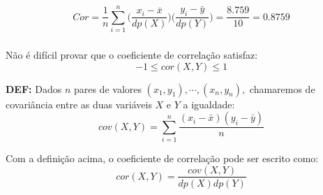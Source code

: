 \documentclass[14pt,aspectratio=1610]{beamer}
\begin{document}
\begin{frame}{}
\frametitle{}
\vspace{-0.5cm}
\begin{table}[htbp]
  \centering
  \caption{Cálculo do coeficiente de correlação.}
\end{table}%
$$Cor={\displaystyle \dfrac{1}{n}\sum_{i=1}^{n}\Biggl(\dfrac{x_{i}-\bar{x}}{dp(X)}\Biggl)\Biggl(\dfrac{y_{i}-\bar{y}}{dp(Y)}\Biggl)}=\dfrac{8.759}{10}=0.8759$$
\end{frame}

\begin{frame}{}
\frametitle{}
\vspace{-0.6cm}
\begin{block}{}
\justifying
Não é difícil provar que o coeficiente de correlação satisfaz:
$$-1\leq cor(X,Y)\leq 1$$
\end{block}
\pause
\vspace{-0.8cm}
\begin{block}{}
\justifying
{\bf DEF:} Dados $n$ pares de valores $(x_{1}, y_{1}), \cdots, (x_{n}, y_{n}),$ chamaremos de covariância entre as duas variáveis $X$ e $Y$ a igualdade:
$$cov(X,Y)={\displaystyle \sum_{i=1}^{n}\dfrac{(x_{i}-\bar{x})(y_{i}-\bar{y})}{n}}$$
\end{block}
\pause
\vspace{-0.8cm}
\begin{block}{}
\justifying
Com a definição acima, o coeficiente de correlação pode ser escrito como:
$$cor(X,Y)=\dfrac{cov(X,Y)}{dp(X)dp(Y)}$$
\end{block}
\end{frame}
\end{document}
